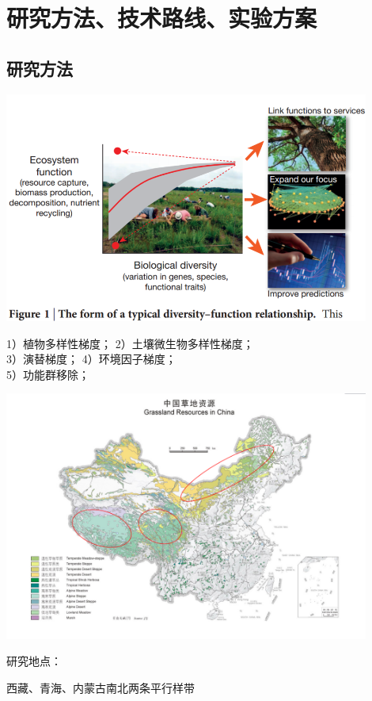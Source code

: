 \section{研究方法、技术路线、实验方案}
\subsection{研究方法}
\begin{frame}{\insertsection}{\insertsubsection}
	\begin{center}
		\includegraphics[width = 0.9\textwidth]{./pic/2.1.1.png}
	\end{center}
1）植物多样性梯度；
2）土壤微生物多样性梯度；\\
3）演替梯度；
4）环境因子梯度；\\
5）功能群移除；
\end{frame}
\begin{frame}{\insertsection}{\insertsubsection}
	\begin{center}
		\includegraphics[width = 0.9\textwidth]{./pic/2.1.2.png}
	\end{center}
	研究地点：
	
	西藏、青海、内蒙古南北两条平行样带
\end{frame}
